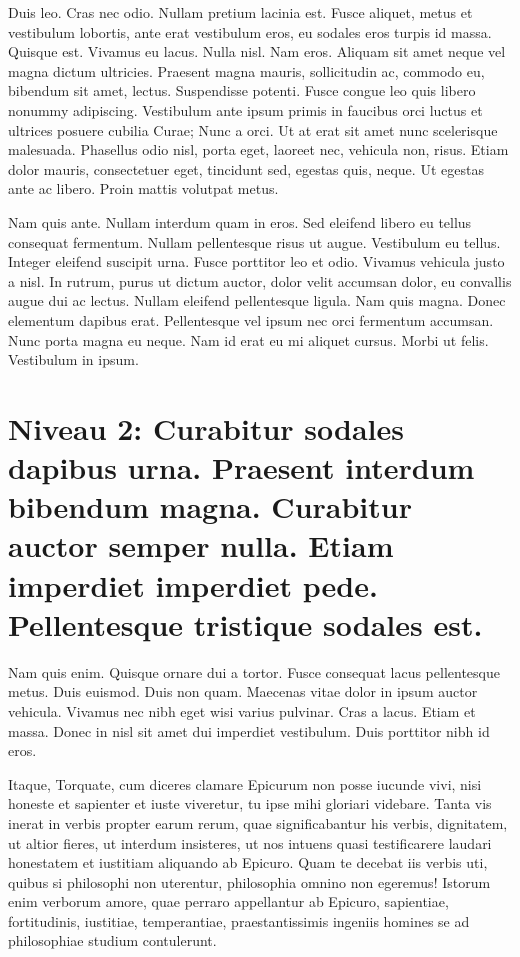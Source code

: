 \documentclass[twoside]{extreport}
\begin{document}
Duis leo. Cras nec odio. Nullam pretium lacinia est. Fusce aliquet,
metus et vestibulum lobortis, ante erat vestibulum eros, eu sodales eros
turpis id massa. Quisque est. Vivamus eu lacus. Nulla nisl. Nam eros.
Aliquam sit amet neque vel magna dictum ultricies. Praesent magna
mauris, sollicitudin ac, commodo eu, bibendum sit amet, lectus.
Suspendisse potenti. Fusce congue leo quis libero nonummy adipiscing.
Vestibulum ante ipsum primis in faucibus orci luctus et ultrices posuere
cubilia Curae; Nunc a orci. Ut at erat sit amet nunc scelerisque
malesuada. Phasellus odio nisl, porta eget, laoreet nec, vehicula non,
risus. Etiam dolor mauris, consectetuer eget, tincidunt sed, egestas
quis, neque. Ut egestas ante ac libero. Proin mattis volutpat metus.

Nam quis ante. Nullam interdum quam in eros. Sed eleifend libero eu
tellus consequat fermentum. Nullam pellentesque risus ut augue.
Vestibulum eu tellus. Integer eleifend suscipit urna. Fusce porttitor
leo et odio. Vivamus vehicula justo a nisl. In rutrum, purus ut dictum
auctor, dolor velit accumsan dolor, eu convallis augue dui ac lectus.
Nullam eleifend pellentesque ligula. Nam quis magna. Donec elementum
dapibus erat. Pellentesque vel ipsum nec orci fermentum accumsan. Nunc
porta magna eu neque. Nam id erat eu mi aliquet cursus. Morbi ut felis.
Vestibulum in ipsum.

\hypertarget{niveau-2-curabitur-sodales-dapibus-urna.-praesent-interdum-bibendum-magna.-curabitur-auctor-semper-nulla.-etiam-imperdiet-imperdiet-pede.-pellentesque-tristique-sodales-est.}{%
\section{Niveau 2: Curabitur sodales dapibus urna. Praesent interdum
bibendum magna. Curabitur auctor semper nulla. Etiam imperdiet imperdiet
pede. Pellentesque tristique sodales
est.}\label{niveau-2-curabitur-sodales-dapibus-urna.-praesent-interdum-bibendum-magna.-curabitur-auctor-semper-nulla.-etiam-imperdiet-imperdiet-pede.-pellentesque-tristique-sodales-est.}}

Nam quis enim. Quisque ornare dui a tortor. Fusce consequat lacus
pellentesque metus. Duis euismod. Duis non quam. Maecenas vitae dolor in
ipsum auctor vehicula. Vivamus nec nibh eget wisi varius pulvinar. Cras
a lacus. Etiam et massa. Donec in nisl sit amet dui imperdiet
vestibulum. Duis porttitor nibh id eros.

Itaque, Torquate, cum diceres clamare Epicurum non posse iucunde vivi,
nisi honeste et sapienter et iuste viveretur, tu ipse mihi gloriari
videbare. Tanta vis inerat in verbis propter earum rerum, quae
significabantur his verbis, dignitatem, ut altior fieres, ut interdum
insisteres, ut nos intuens quasi testificarere laudari honestatem et
iustitiam aliquando ab Epicuro. Quam te decebat iis verbis uti, quibus
si philosophi non uterentur, philosophia omnino non egeremus! Istorum
enim verborum amore, quae perraro appellantur ab Epicuro, sapientiae,
fortitudinis, iustitiae, temperantiae, praestantissimis ingeniis homines
se ad philosophiae studium contulerunt.
\end{document}
